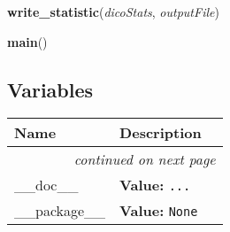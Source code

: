     \vspace{0.5ex}

\hspace{.8\funcindent}\begin{boxedminipage}{\funcwidth}

    \raggedright \textbf{write\_statistic}(\textit{dicoStats}, \textit{outputFile})

\setlength{\parskip}{2ex}
\setlength{\parskip}{1ex}
    \end{boxedminipage}

    \label{script-iReportMaker2:main}

    \vspace{0.5ex}

\hspace{.8\funcindent}\begin{boxedminipage}{\funcwidth}

    \raggedright \textbf{main}()

\setlength{\parskip}{2ex}
\setlength{\parskip}{1ex}
    \end{boxedminipage}



  \subsection{Variables}

    \vspace{-1cm}
\hspace{\varindent}\begin{longtable}{|p{\varnamewidth}|p{\vardescrwidth}|l}
\cline{1-2}
\cline{1-2} \centering \textbf{Name} & \centering \textbf{Description}& \\
\cline{1-2}
\endhead\cline{1-2}\multicolumn{3}{r}{\small\textit{continued on next page}}\\\endfoot\cline{1-2}
\endlastfoot\raggedright \_\-\_\-d\-o\-c\-\_\-\_\- & \raggedright \textbf{Value:} 
{\tt \texttt{...}}&\\
\cline{1-2}
\raggedright \_\-\_\-p\-a\-c\-k\-a\-g\-e\-\_\-\_\- & \raggedright \textbf{Value:} 
{\tt None}&\\
\cline{1-2}
\end{longtable}

